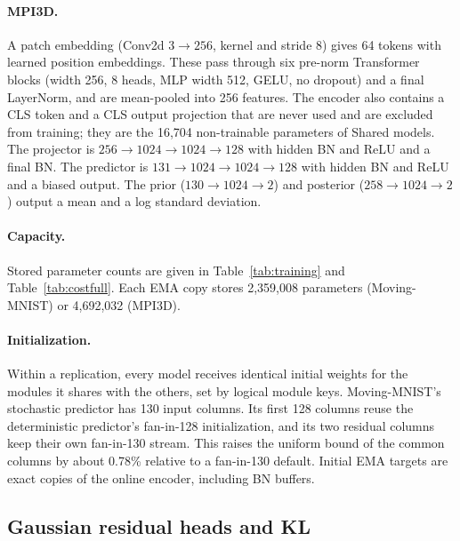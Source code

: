 \paragraph{MPI3D.} A patch embedding (Conv2d $3\to256$, kernel and stride 8) gives 64 tokens with learned position embeddings. These pass through six pre-norm Transformer blocks (width 256, 8 heads, MLP width 512, GELU, no dropout) and a final LayerNorm, and are mean-pooled into 256 features. The encoder also contains a CLS token and a CLS output projection that are never used and are excluded from training; they are the 16{,}704 non-trainable parameters of Shared models. The projector is $256\to1024\to1024\to128$ with hidden BN and ReLU and a final BN. The predictor is $131\to1024\to1024\to128$ with hidden BN and ReLU and a biased output. The prior ($130\to1024\to2$) and posterior ($258\to1024\to2$) output a mean and a log standard deviation.

\paragraph{Capacity.} Stored parameter counts are given in Table~\ref{tab:training} and Table~\ref{tab:costfull}. Each EMA copy stores 2{,}359{,}008 parameters (Moving-MNIST) or 4{,}692{,}032 (MPI3D).

\paragraph{Initialization.} Within a replication, every model receives identical initial weights for the modules it shares with the others, set by logical module keys. Moving-MNIST's stochastic predictor has 130 input columns. Its first 128 columns reuse the deterministic predictor's fan-in-128 initialization, and its two residual columns keep their own fan-in-130 stream. This raises the uniform bound of the common columns by about 0.78\% relative to a fan-in-130 default. Initial EMA targets are exact copies of the online encoder, including BN buffers.

\subsection{Gaussian residual heads and KL}
\label{app:heads}

